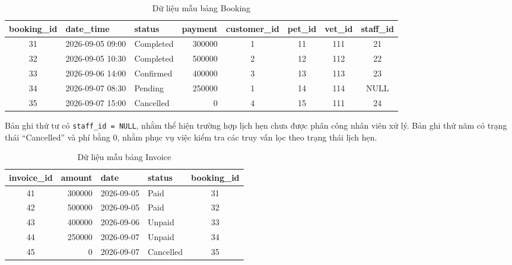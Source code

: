 \begin{table}[htbp]
    \centering
    \caption{Dữ liệu mẫu bảng Booking}
    \label{tab:data_booking}
    \begin{tabular}{|c|l|l|r|c|c|c|c|}
        \hline
        \textbf{booking\_id} & \textbf{date\_time} & \textbf{status} &
        \textbf{payment} & \textbf{customer\_id} & \textbf{pet\_id} &
        \textbf{vet\_id} & \textbf{staff\_id} \\ \hline

        31 & 2026-09-05 09:00 & Completed & 300000 & 1 & 11 & 111 & 21 \\ \hline
        32 & 2026-09-05 10:30 & Completed & 500000 & 2 & 12 & 112 & 22 \\ \hline
        33 & 2026-09-06 14:00 & Confirmed & 400000 & 3 & 13 & 113 & 23 \\ \hline
        34 & 2026-09-07 08:30 & Pending & 250000 & 1 & 14 & 114 & NULL \\ \hline
        35 & 2026-09-07 15:00 & Cancelled & 0 & 4 & 15 & 111 & 24 \\ \hline

    \end{tabular}
\end{table}

Bản ghi thứ tư có \texttt{staff\_id = NULL}, nhằm thể hiện trường hợp lịch hẹn
chưa được phân công nhân viên xử lý. Bản ghi thứ năm có trạng thái
``Cancelled'' và phí bằng 0, nhằm phục vụ việc kiểm tra các truy vấn lọc
theo trạng thái lịch hẹn.


\begin{table}[htbp]
    \centering
    \caption{Dữ liệu mẫu bảng Invoice}
    \label{tab:data_invoice}
    \begin{tabular}{|c|r|l|l|c|}
        \hline
        \textbf{invoice\_id} & \textbf{amount} & \textbf{date} &
        \textbf{status} & \textbf{booking\_id} \\ \hline

        41 & 300000 & 2026-09-05 & Paid & 31 \\ \hline
        42 & 500000 & 2026-09-05 & Paid & 32 \\ \hline
        43 & 400000 & 2026-09-06 & Unpaid & 33 \\ \hline
        44 & 250000 & 2026-09-07 & Unpaid & 34 \\ \hline
        45 & 0 & 2026-09-07 & Cancelled & 35 \\ \hline

    \end{tabular}
\end{table}

